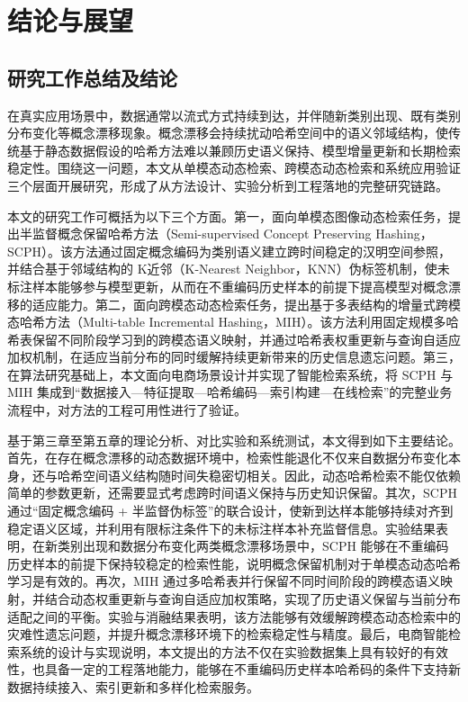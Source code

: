 \chapter{结论与展望}

\section{研究工作总结及结论}
在真实应用场景中，数据通常以流式方式持续到达，并伴随新类别出现、既有类别分布变化等概念漂移现象。概念漂移会持续扰动哈希空间中的语义邻域结构，使传统基于静态数据假设的哈希方法难以兼顾历史语义保持、模型增量更新和长期检索稳定性。围绕这一问题，本文从单模态动态检索、跨模态动态检索和系统应用验证三个层面开展研究，形成了从方法设计、实验分析到工程落地的完整研究链路。

本文的研究工作可概括为以下三个方面。第一，面向单模态图像动态检索任务，提出半监督概念保留哈希方法（Semi-supervised Concept Preserving Hashing，SCPH）。该方法通过固定概念编码为类别语义建立跨时间稳定的汉明空间参照，并结合基于邻域结构的 K近邻（K-Nearest Neighbor，KNN）伪标签机制，使未标注样本能够参与模型更新，从而在不重编码历史样本的前提下提高模型对概念漂移的适应能力。第二，面向跨模态动态检索任务，提出基于多表结构的增量式跨模态哈希方法（Multi-table Incremental Hashing，MIH）。该方法利用固定规模多哈希表保留不同阶段学习到的跨模态语义映射，并通过哈希表权重更新与查询自适应加权机制，在适应当前分布的同时缓解持续更新带来的历史信息遗忘问题。第三，在算法研究基础上，本文面向电商场景设计并实现了智能检索系统，将 SCPH 与 MIH 集成到“数据接入—特征提取—哈希编码—索引构建—在线检索”的完整业务流程中，对方法的工程可用性进行了验证。

基于第三章至第五章的理论分析、对比实验和系统测试，本文得到如下主要结论。首先，在存在概念漂移的动态数据环境中，检索性能退化不仅来自数据分布变化本身，还与哈希空间语义结构随时间失稳密切相关。因此，动态哈希检索不能仅依赖简单的参数更新，还需要显式考虑跨时间语义保持与历史知识保留。其次，SCPH 通过“固定概念编码 + 半监督伪标签”的联合设计，使新到达样本能够持续对齐到稳定语义区域，并利用有限标注条件下的未标注样本补充监督信息。实验结果表明，在新类别出现和数据分布变化两类概念漂移场景中，SCPH 能够在不重编码历史样本的前提下保持较稳定的检索性能，说明概念保留机制对于单模态动态哈希学习是有效的。再次，MIH 通过多哈希表并行保留不同时间阶段的跨模态语义映射，并结合动态权重更新与查询自适应加权策略，实现了历史语义保留与当前分布适配之间的平衡。实验与消融结果表明，该方法能够有效缓解跨模态动态检索中的灾难性遗忘问题，并提升概念漂移环境下的检索稳定性与精度。最后，电商智能检索系统的设计与实现说明，本文提出的方法不仅在实验数据集上具有较好的有效性，也具备一定的工程落地能力，能够在不重编码历史样本哈希码的条件下支持新数据持续接入、索引更新和多样化检索服务。

